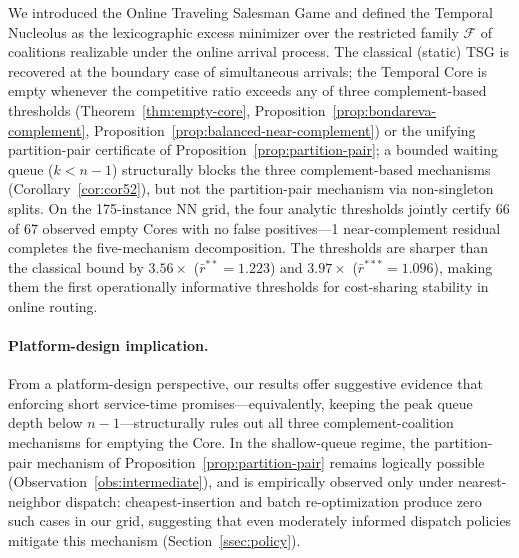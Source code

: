 \documentclass[11pt]{article}
\theoremstyle{plain}
\theoremstyle{definition}
\theoremstyle{remark}
\newcommand{\F}{\mathcal{F}}
\begin{document}
We introduced the Online Traveling Salesman Game and defined the Temporal Nucleolus as the lexicographic excess minimizer over the restricted family $\F$ of coalitions realizable under the online arrival process. The classical (static) TSG is recovered at the boundary case of simultaneous arrivals; the Temporal Core is empty whenever the competitive ratio exceeds any of three complement-based thresholds (Theorem~\ref{thm:empty-core}, Proposition~\ref{prop:bondareva-complement}, Proposition~\ref{prop:balanced-near-complement}) or the unifying partition-pair certificate of Proposition~\ref{prop:partition-pair}; a bounded waiting queue ($k<n-1$) structurally blocks the three complement-based mechanisms (Corollary~\ref{cor:cor52}), but not the partition-pair mechanism via non-singleton splits. On the 175-instance NN grid, the four analytic thresholds jointly certify 66 of 67 observed empty Cores with no false positives---1 near-complement residual completes the five-mechanism decomposition. The thresholds are sharper than the classical bound by $3.56\times$ ($\bar r^{\ast\ast}=1.223$) and $3.97\times$ ($\bar r^{\ast\ast\ast}=1.096$), making them the first operationally informative thresholds for cost-sharing stability in online routing.

\paragraph{Platform-design implication.} From a platform-design perspective, our results offer suggestive evidence that enforcing short service-time promises---equivalently, keeping the peak queue depth below $n-1$---structurally rules out all three complement-coalition mechanisms for emptying the Core. In the shallow-queue regime, the partition-pair mechanism of Proposition~\ref{prop:partition-pair} remains logically possible (Observation~\ref{obs:intermediate}), and is empirically observed only under nearest-neighbor dispatch: cheapest-insertion and batch re-optimization produce zero such cases in our grid, suggesting that even moderately informed dispatch policies mitigate this mechanism (Section~\ref{ssec:policy}).
\end{document}

